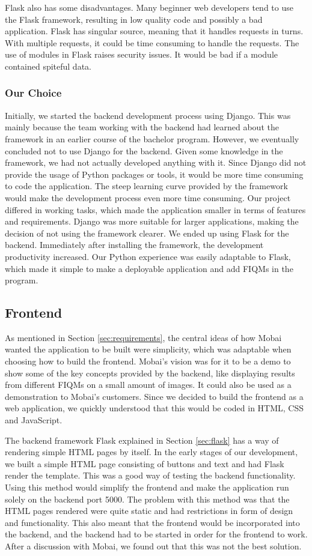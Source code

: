 Flask also has some disadvantages. Many beginner web developers tend to use the Flask framework, resulting in low quality code and possibly a bad application. Flask has singular source, meaning that it handles requests in turns. With multiple requests, it could be time consuming to handle the requests. The use of modules in Flask raises security issues. It would be bad if a module contained spiteful data. 

\subsubsection*{Our Choice}
Initially, we started the backend development process using Django. This was mainly because the team working with the backend had learned about the framework in an earlier course of the bachelor program. However, we eventually concluded not to use Django for the backend. Given some knowledge in the framework, we had not actually developed anything with it. Since Django did not provide the usage of Python packages or tools, it would be more time consuming to code the application. The steep learning curve provided by the framework would make the development process even more time consuming. Our project differed in working tasks, which made the application smaller in terms of features and requirements. Django was more suitable for larger applications, making the decision of not using the framework clearer. We ended up using Flask for the backend. Immediately after installing the framework, the development productivity increased. Our Python experience was easily adaptable to Flask, which made it simple to make a deployable application and add FIQMs in the program. 

\subsection{Frontend}
As mentioned in Section \ref{sec:requirements}, the central ideas of how Mobai wanted the application to be built were simplicity, which was adaptable when choosing how to build the frontend. Mobai's vision was for it to be a demo to show some of the key concepts provided by the backend, like displaying results from different FIQMs on a small amount of images. It could also be used as a demonstration to Mobai's customers. Since we decided to build the frontend as a web application, we quickly understood that this would be coded in HTML, CSS and JavaScript. 

The backend framework Flask explained in Section \ref{sec:flask} has a way of rendering simple HTML pages by itself. In the early stages of our development, we built a simple HTML page consisting of buttons and text and had Flask render the template. This was a good way of testing the backend functionality. Using this method would simplify the frontend and make the application run solely on the backend port 5000. The problem with this method was that the HTML pages rendered were quite static and had restrictions in form of design and functionality. This also meant that the frontend would be incorporated into the backend, and the backend had to be started in order for the frontend to work. After a discussion with Mobai, we found out that this was not the best solution. 

